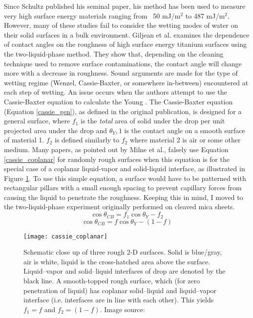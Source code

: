 Since Schultz published his seminal paper, his method has been used to measure very high surface energy materials ranging from ~50 mJ/m$^{2}$ to 487 mJ/m$^{2}$.\cite{Nakamura2015} However, many of these studies fail to consider the wetting modes of water on their solid surfaces in a bulk \nalk environment. Giljean et al. examines the dependence of contact angles on the roughness of high surface energy titanium surfaces using the two-liquid-phase method. They show that, depending on the cleaning technique used to remove surface contaminations, the contact angle will change more with a decrease in roughness. Sound arguments are made for the type of wetting regime (Wenzel, Cassie-Baxter, or somewhere in-between) encountered at each step of wetting. An issue occurs when the authors attempt to use the Cassie-Baxter equation to calculate the Young \ca. The Cassie-Baxter equation (Equation \ref{cassie_gen}), as defined in the original publication,\cite{Cassie1944} is designed for a general surface, where $f_1$ is the \textit{total} area of solid under the drop per unit projected area under the drop and $\theta_Y,1$ is the contact angle on a smooth surface of material 1. $f_2$ is defined similarly to $f_2$ where material 2 is air or some other medium. Many papers, as pointed out by Milne et al.,\cite{Milne2012} falsely use Equation \ref{cassie_coplanar} for randomly rough surfaces when this equation is for the special case of a coplanar liquid-vapor and solid-liquid interface, as illustrated in Figure \ref{fig:cassie_coplanar}. To use this simple equation, a surface would have to be patterned with rectangular pillars with a small enough spacing to prevent capillary forces from causing the liquid to penetrate the roughness. Keeping this in mind, I moved to the two-liquid-phase experiment originally performed on cleaved mica sheets. 
\begin{equation}
\label{cassie_gen}	
\cos\theta_{CB} = f_{1}\cos\theta_{Y} - f_{2}
\end{equation}
\begin{equation}
	\label{cassie_coplanar}	
	\cos\theta_{CB} = f\cos\theta_{Y} - (1-f)
\end{equation}

\begin{figure}[h]
	\centering
	\texttt{[image: cassie\_coplanar]}
	\caption{Schematic close up of three rough 2-D surfaces. Solid is blue/gray, air is white, liquid is the cross-hatched area above the surface. Liquid–vapor and solid–liquid interfaces of drop are denoted by the black line. A smooth-topped rough surface, which (for zero penetration of liquid) has coplanar solid–liquid and liquid–vapor interface (i.e. interfaces are in line with each other). This yields $ f_{1}=f $ and $ f_{2}=(1-f) $. Image source: \cite{Milne2012}}
	\label{fig:cassie_coplanar}
\end{figure}

